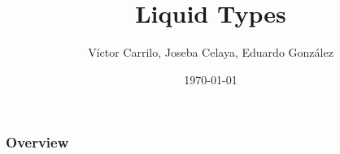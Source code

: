 \documentclass{beamer}
\title[Short title]{Liquid Types}
\author{Víctor Carrilo, Joseba Celaya, Eduardo González}
\institute[UCM/UAM/UPM]{
Universidad Complutense de Madrid\\
\medskip
}
\date{\today}
\begin{document}
\begin{frame}
\titlepage 
\end{frame}

\begin{frame}
\frametitle{Overview} 
\tableofcontents 
\end{frame}







\end{document}
